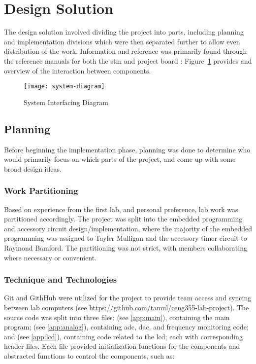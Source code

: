 
\section{Design Solution}
The design solution involved dividing the project into parts, including
planning and implementation divisions which were then separated further
to allow even distribution of the work. Information and reference was
primarily found through the reference manuals for both the \gls{stm} and
project board \cite{ref,board}: Figure~\ref{fig:system} provides and
overview of the interaction between components.

\begin{figure}
	\centering
	\texttt{[image: system-diagram]}
	\caption{System Interfacing Diagram \cite{lab-manual}}
	\label{fig:system}
\end{figure}

\subsection{Planning}
Before beginning the implementation phase, planning was done to
determine who would primarily focus on which parts of the project, and
come up with some broad design ideas.
\subsubsection{Work Partitioning}
Based on experience from the first lab, and personal preference, lab
work was partitioned accordingly. The project was split into the
embedded programming and accessory circuit design/implementation, where
the majority of the embedded programming was assigned to Tayler Mulligan
and the accessory timer circuit to Raymond Bamford. The partitioning was
not strict, with members collaborating where necessary or convenient.

\subsubsection{Technique and Technologies}
Git and GithHub were utilized for the project to provide team access and
syncing between lab computers (see
\url{https://github.com/tamul/ceng355-lab-project}). The source code was
split into three files:  (see \ref{app:main}), containing the main program;
 (see \ref{app:analog}), containing \gls{adc},
\gls{dac}, and frequency monitoring
code; and  (see \ref{app:lcd}), containing code related
to the \gls{lcd}; each with corresponding header files. Each file
provided initialization functions for the components and abstracted
functions to control the components, such as:

